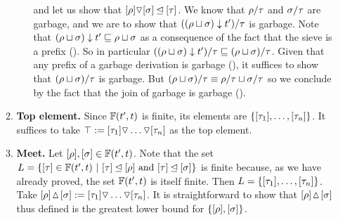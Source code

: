 \begin{enumerate}
\begin{enumerate}
\begin{enumerate}
      and let us show that $[\rho] \triangledown [\sigma] \unlhd [\tau]$.
      We know that $\rho/\tau$ and $\sigma/\tau$ are garbage,
      and we are to show that $((\rho \sqcup \sigma) \downarrow t')/\tau$
      is garbage.
      Note that $(\rho \sqcup \sigma) \downarrow t' \sqsubseteq \rho \sqcup \sigma$
      as a consequence of the fact that the sieve is a prefix ().
      So in particular $((\rho \sqcup \sigma) \downarrow t')/\tau \sqsubseteq (\rho \sqcup \sigma)/\tau$.
      Given that any prefix of a garbage derivation is garbage (),
      it suffices to show that $(\rho \sqcup \sigma)/\tau$ is garbage.
      But $(\rho \sqcup \sigma)/\tau \equiv \rho/\tau \sqcup \sigma/\tau$
      so we conclude by the fact that the join of garbage is garbage ().
    \end{enumerate}
  \item {\bf Top element.}
    Since $\mathbb{F}(t', t)$ is finite,
    its elements are $\{{[\tau_1]}, \hdots, {[\tau_n]}\}$.
    It suffices to take $\top := {[\tau_1]} \triangledown \hdots \triangledown {[\tau_n]}$
    as the top element.
  \item {\bf Meet.}
    Let ${[\rho]},{[\sigma]} \in \mathbb{F}(t', t)$.
    Note that the set $L = \{{[\tau]} \in \mathbb{F}(t', t) \ |\  {[\tau]} \unlhd {[\rho]} \text{ and } {[\tau]} \unlhd {[\sigma]}\}$
    is finite because, as we have already proved, the set $\mathbb{F}(t', t)$ is itself finite.
    Then $L = \{{[\tau_1]}, \hdots, {[\tau_n]}\}$.
    Take ${[\rho]} \!\vartriangle\! {[\sigma]} := {[\tau_1]} \triangledown \hdots \triangledown {[\tau_n]}$.
    It is straightforward to show that ${[\rho]} \!\vartriangle\! {[\sigma]}$
    thus defined is the greatest lower bound for $\{{[\rho]},{[\sigma]}\}$.
  \end{enumerate}


\end{enumerate}
